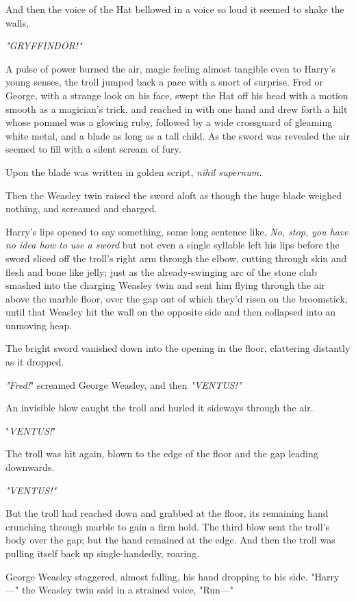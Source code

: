 And then the voice of the Hat bellowed in a voice so loud it seemed to shake 
the walls,

\emph{"GRYFFINDOR!"}

A pulse of power burned the air, magic feeling almost tangible even to Harry's 
young senses, the troll jumped back a pace with a snort of surprise. Fred or 
George, with a strange look on his face, swept the Hat off his head with a 
motion smooth as a magician's trick, and reached in with one hand and drew 
forth a hilt whose pommel was a glowing ruby, followed by a wide crossguard of 
gleaming white metal, and a blade as long as a tall child. As the sword was 
revealed the air seemed to fill with a silent scream of fury.

Upon the blade was written in golden script, \emph{nihil supernum.}

Then the Weasley twin raised the sword aloft as though the huge blade weighed 
nothing, and screamed and charged.

Harry's lips opened to say something, some long sentence like, \emph{No, stop, 
you have no idea how to use a sword} but not even a single syllable left his 
lips before the sword sliced off the troll's right arm through the elbow, 
cutting through skin and flesh and bone like jelly; just as the 
already-swinging arc of the stone club smashed into the charging Weasley twin 
and sent him flying through the air above the marble floor, over the gap out of 
which they'd risen on the broomstick, until that Weasley hit the wall on the 
opposite side and then collapsed into an unmoving heap.

The bright sword vanished down into the opening in the floor, clattering 
distantly as it dropped.

\emph{"Fred!}" screamed George Weasley, and then \emph{"VENTUS!"}

An invisible blow caught the troll and hurled it sideways through the air.

"\emph{VENTUS!}"

The troll was hit again, blown to the edge of the floor and the gap leading 
downwards.

\emph{"VENTUS!"}

But the troll had reached down and grabbed at the floor, its remaining hand 
crunching through marble to gain a firm hold. The third blow sent the troll's 
body over the gap; but the hand remained at the edge. And then the troll was 
pulling itself back up single-handedly, roaring.

George Weasley staggered, almost falling, his hand dropping to his side. 
"Harry---" the Weasley twin said in a strained voice, "Run---"

